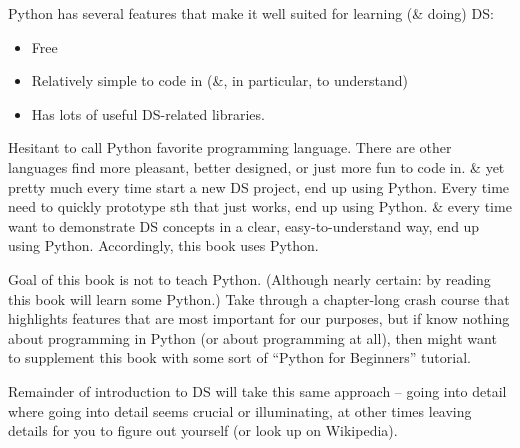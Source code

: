 \documentclass{article}
\begin{document}
\begin{itemize}
\begin{itemize}
		Python has several features that make it well suited for learning (\& doing) DS:
		\begin{itemize}
			\item Free
			\item Relatively simple to code in (\&, in particular, to understand)
			\item Has lots of useful DS-related libraries.
		\end{itemize}
		Hesitant to call Python favorite programming language. There are other languages find more pleasant, better designed, or just more fun to code in. \& yet pretty much every time start a new DS project, end up using Python. Every time need to quickly prototype sth that just works, end up using Python. \& every time want to demonstrate DS concepts in a clear, easy-to-understand way, end up using Python. Accordingly, this book uses Python.
		
		Goal of this book is not to teach Python. (Although nearly certain: by reading this book will learn some Python.) Take through a chapter-long crash course that highlights features that are most important for our purposes, but if know nothing about programming in Python (or about programming at all), then might want to supplement this book with some sort of ``Python for Beginners'' tutorial.
		
		Remainder of introduction to DS will take this same approach -- going into detail where going into detail seems crucial or illuminating, at other times leaving details for you to figure out yourself (or look up on Wikipedia).
		

\end{itemize}
\end{itemize}
\end{document}
